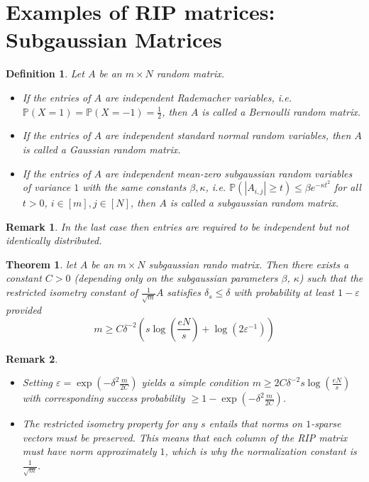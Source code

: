 \documentclass[10pt,a4paper]{article}
\theoremstyle{thmstyle}
\newtheorem{definition}{Definition}
\newtheorem{theorem}{Theorem}
\newtheorem{remark}{Remark}
\renewcommand{\Pr}[1]{\mathbb{P}\left( #1 \right)}
\begin{document}
\section{Examples of RIP matrices: Subgaussian Matrices}

\begin{definition}
  Let $A$ be an $m \times N$ random matrix.
  \begin{itemize}
  \item If the entries of $A$ are independent Rademacher variables, i.e. $\Pr{X = 1} = \Pr{X = -1} = \frac{1}{2}$, then $A$ is called a \emph{Bernoulli random matrix}.
  \item If the entries of $A$ are independent standard normal random variables, then $A$ is called a \emph{Gaussian random matrix}.
  \item If the entries of $A$ are independent mean-zero subgaussian random variables of variance $1$ with the same constants $\beta, \kappa$, i.e. $\Pr{|A_{i,j}| \ge t} \le \beta e^{-\kappa t^{2}}$ for all $t > 0$, $i \in [m], j \in [N]$, then $A$ is called a \emph{subgaussian random matrix}.
  \end{itemize}
\end{definition}

\begin{remark}
  In the last case then entries are required to be independent but not identically distributed.
\end{remark}

\begin{theorem}
  let $A$ be an $m \times N$ subgaussian rando matrix.
  Then there exists a constant $C > 0$ (depending only on the subgaussian parameters $\beta$, $\kappa$) such that the restricted isometry constant of $\frac{1}{\sqrt{m}}A$ satisfies $\delta_{s} \le \delta$ with probability at least $1 - \varepsilon$ provided
  \begin{equation*}
    m \ge C \delta^{-2} \left( s \log\left( \frac{eN}{s} \right) + \log(2\varepsilon^{-1}) \right)
  \end{equation*}
\end{theorem}

\begin{remark}
  \begin{itemize}
  \item Setting $\varepsilon = \exp\left( -\delta^{2} \frac{m}{2C} \right)$ yields a simple condition $m \ge 2C\delta^{-2} s \log\left( \frac{eN}{s} \right)$ with corresponding success probability $\ge 1 - \exp\left( -\delta^{2} \frac{m}{2C} \right)$.
  \item The restricted isometry property for any $s$ entails that norms on $1$-sparse vectors must be preserved.
    This means that each column of the RIP matrix must have norm approximately $1$, which is why the normalization constant is $\frac{1}{\sqrt{m}}$.
  \end{itemize}
\end{remark}
\end{document}
